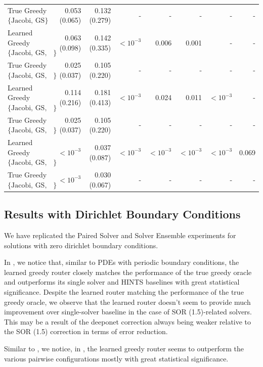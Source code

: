 \documentclass{article}
\begin{document}
\begin{table}[H]
{\begin{tabular}{lrrrrrrr}
True Greedy$\{\text{Jacobi, GS}\}$ & 0.053 (0.065) & 0.132 (0.279) & - & - & - & - & - \\
Learned Greedy $\{\text{Jacobi, GS, SymGS}\}$ & 0.063 (0.098) & 0.142 (0.335) & $<10^{-3}$ & 0.006 & 0.001 & - & - \\
True Greedy $\{\text{Jacobi, GS, SymGS}\}$ & 0.025 (0.037) & 0.105 (0.220) & - & - & - & - & - \\
Learned Greedy $\{\text{Jacobi, GS, SymGS, Jacobi (0.67)}\}$ & 0.114 (0.216) & 0.181 (0.413) & $<10^{-3}$ & 0.024 & 0.011 & $<10^{-3}$ & - \\
True Greedy $\{\text{Jacobi, GS, SymGS, Jacobi (0.67)}\}$ & 0.025 (0.037) & 0.105 (0.220) & - & - & - & - & - \\
Learned Greedy $\{\text{Jacobi, GS, SymGS, Jacobi (0.67), SOR (1.5)}\}$ & $<10^{-3}$ & 0.037 (0.087) & $<10^{-3}$ & $<10^{-3}$ & $<10^{-3}$ & $<10^{-3}$ & 0.069 \\
True Greedy $\{\text{Jacobi, GS, SymGS, Jacobi (0.67), SOR (1.5)}\}$ & $<10^{-3}$ & 0.030 (0.067) & - & - & - & - & - \\
\hline \hline
\end{tabular}
}
    \label{tab:errorcomparison_fine_2}
\end{table}

\subsection{Results with Dirichlet Boundary Conditions} \label{sec:dirichlet}

We have replicated the Paired Solver and Solver Ensemble experiments for solutions with zero dirichlet boundary conditions.

In , we notice that, similar to PDEs with periodic boundary conditions, the learned greedy router closely matches the performance of the true greedy oracle and outperforms its single solver and HINTS baselines with great statistical significance. Despite the learned router matching the performance of the true greedy oracle, we observe that the learned router doesn't seem to provide much improvement over single-solver baseline in the case of SOR (1.5)-related solvers. This may be a result of the deeponet correction always being weaker relative to the SOR (1.5) correction in terms of error reduction. 

Similar to , we notice, in , the learned greedy router seems to outperform the various pairwise configurations mostly with great statistical significance. 
\end{document}
